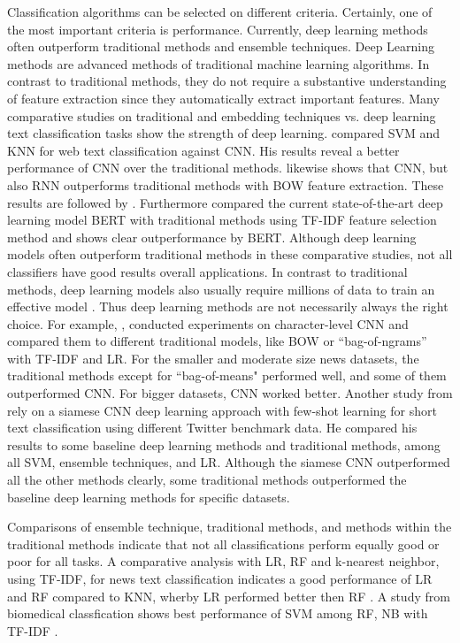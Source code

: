\documentclass[12pt, a4paper, titlepage]{article}
\begin{document}
Classification algorithms can be selected on different criteria. Certainly, one of the most important criteria is performance. Currently, deep learning methods often outperform traditional methods and ensemble techniques. Deep Learning methods are advanced methods of traditional machine learning algorithms. In contrast to traditional methods, they do not require a substantive understanding of feature extraction since they automatically extract important features. Many comparative studies on traditional and embedding techniques vs. deep learning text classification tasks show the strength of deep learning. \citet{wang2017} compared \ac{SVM} and \ac{KNN} for web text classification against \ac{CNN}. His results reveal a better performance of \ac{CNN} over the traditional methods. \citet{hassan2017} likewise shows that \ac{CNN}, but also \ac{RNN} outperforms traditional methods with \ac{BOW} feature extraction. These results are followed by \citet{kamath2018}. Furthermore \citet{gonzalez2020} compared the current state-of-the-art deep learning model \ac{BERT} with traditional methods using \ac{TF-IDF} feature selection method and shows clear outperformance by \ac{BERT}. Although deep learning models often outperform traditional methods in these comparative studies, not all classifiers have good results overall applications. In contrast to traditional methods, deep learning models also usually require millions of data to train an effective model \citep{chauhan2018}. Thus deep learning methods are not necessarily always the right choice. For example, \citet{zhang2015}, conducted experiments on character-level \ac{CNN} and compared them to different traditional models, like \ac{BOW} or ``bag-of-ngrams'' with \ac{TF-IDF} and \ac{LR}. For the smaller and moderate size news datasets, the traditional methods except for ``bag-of-means" performed well, and some of them outperformed \ac{CNN}. For bigger datasets, \ac{CNN} worked better. Another study from \citet{yan2018} rely on a siamese \ac{CNN} deep learning approach with few-shot learning for short text classification using different Twitter benchmark data. He compared his results to some baseline deep learning methods and traditional methods, among all \ac{SVM}, ensemble techniques, and \ac{LR}. Although the siamese \ac{CNN} outperformed all the other methods clearly, some traditional methods outperformed the baseline deep learning methods for specific datasets.  

Comparisons of ensemble technique, traditional methods, and methods within the traditional methods indicate that not all classifications perform equally good or poor for all tasks. A comparative analysis with \ac{LR}, \ac{RF} and k-nearest neighbor, using \ac{TF-IDF}, for news text classification indicates a good performance of \ac{LR} and \ac{RF} compared to \ac{KNN}, wherby \ac{LR} performed better then \ac{RF} \citep{shah2020}. A study from biomedical classfication shows best performance of \ac{SVM} among \ac{RF}, \ac{NB} with \ac{TF-IDF} \citep{danso2014}. 
\end{document}
